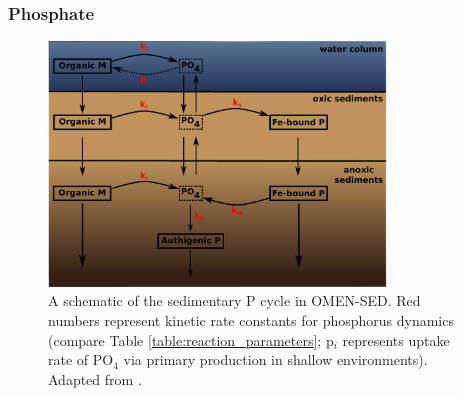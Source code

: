 \documentclass[gmd, manuscript]{copernicus}
\begin{document}


\subsubsection{Phosphate}\label{subsubsec:P}

\begin{figure}[htbp]
\begin{center}
	\includegraphics[width=0.8\textwidth]{figures/P-cycle.pdf}
	\caption{A schematic of the sedimentary P cycle in OMEN-SED. Red numbers represent kinetic rate constants for phosphorus dynamics (compare Table \ref{table:reaction_parameters}; p$_i$ represents uptake rate of PO$_4$ 
	via primary production in shallow environments). Adapted from \citet{caroline_p_slomp_key_1996}.}
	\label{fig:P-cycle}
	\end{center}
\end{figure}
\end{document}
